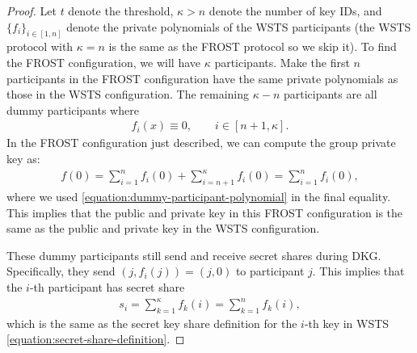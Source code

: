 \documentclass{article}
\begin{document}
\begin{proof} 
Let $t$ denote the threshold, $\kappa > n$ denote the number of key IDs, and $\{ f_i \}_{i\in [1,n]}$ denote the private polynomials of the WSTS participants (the WSTS protocol with $\kappa = n$ is the same as the FROST protocol so we skip it). To find the FROST configuration, we will have $\kappa$ participants. Make the first $n$ participants in the FROST configuration have the same private polynomials as those in the WSTS configuration. The remaining $\kappa - n$ participants are all dummy participants where
\begin{align}\label{equation:dummy-participant-polynomial}
    f_i(x) \equiv 0, \qquad i \in [n+1, \kappa].
\end{align}
In the FROST configuration just described, we can compute the group private key as:
\begin{align}
    f(0) = \sum_{i=1}^n f_i(0) + \sum_{i = n+1}^\kappa f_i(0) = \sum_{i=1}^n f_i(0),
\end{align}
where we used \eqref{equation:dummy-participant-polynomial} in the final equality. This implies that the public and private key in this FROST configuration is the same as the public and private key in the WSTS configuration.

These dummy participants still send and receive secret shares during DKG. Specifically, they send $(j, f_i(j)) = (j, 0)$ to participant $j$. This implies that the $i$-th participant has secret share
\begin{align}
    s_i = \sum_{k=1}^\kappa f_k(i) = \sum_{k=1}^n f_k(i),
\end{align}
which is the same as the secret key share definition for the $i$-th key in WSTS \eqref{equation:secret-share-definition}.


\end{proof}
\end{document}
